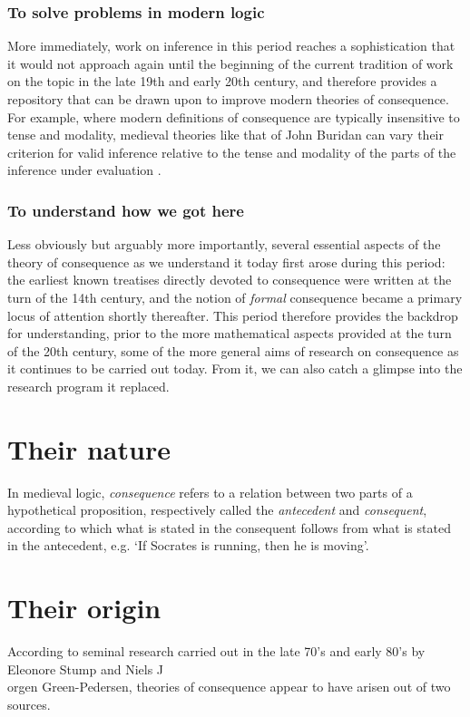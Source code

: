 \documentclass[]{article}
\begin{document}
\subsubsection{To solve problems in modern logic}
More immediately, 
work on inference in this period reaches a sophistication that it would not approach again until the beginning of the current tradition of work on the topic in the late 19th and early 20th century, 
and therefore provides a repository that can be drawn upon to improve modern theories of consequence. 
For example, 
where modern definitions of consequence are typically insensitive to tense and modality, 
medieval theories like that of John Buridan can vary their criterion for valid inference relative to the tense and modality of the parts of the inference under evaluation \cite{Read2015}.

\subsubsection{To understand how we got here}
Less obviously but arguably more importantly, 
several essential aspects of the theory of consequence as we understand it today first arose during this period: 
the earliest known treatises directly devoted to consequence were written at the turn of the 14th century, 
and the notion of \emph{formal} consequence became a primary locus of attention shortly thereafter. 
This period therefore provides the backdrop for understanding, 
prior to the more mathematical aspects provided at the turn of the 20th century, 
some of the more general aims of research on consequence as it continues to be carried out today. 
From it, we can also catch a glimpse into the research program it replaced. 

\section{Their nature}
In medieval logic, 
\emph{consequence} refers to a relation between two parts of a hypothetical proposition, 
respectively called the \emph{antecedent} and \emph{consequent}, 
according to which what is stated in the consequent follows from what is stated in the antecedent, 
e.g. `If Socrates is running, then he is moving'. 

\section{Their origin}
According to seminal research carried out in the late 70's and early 80's by Eleonore Stump and Niels J\\o{}rgen Green-Pedersen,
theories of consequence appear to have arisen out of two sources. 
\end{document}
